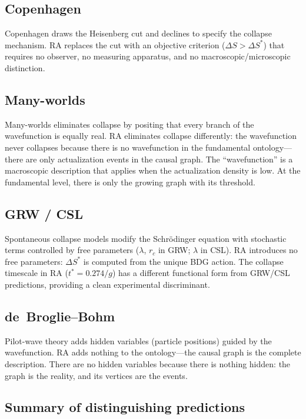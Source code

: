 \documentclass[11pt,a4paper]{article}
\theoremstyle{plain}
\theoremstyle{definition}
\theoremstyle{remark}
\begin{document}
\subsection{Copenhagen}\label{sec:copenhagen}

Copenhagen draws the Heisenberg cut and declines to specify the collapse mechanism.
RA replaces the cut with an objective criterion ($\Delta S > \Delta S^*$) that
requires no observer, no measuring apparatus, and no macroscopic/microscopic
distinction.

\subsection{Many-worlds}\label{sec:manyworlds}

Many-worlds eliminates collapse by positing that every branch of the wavefunction is
equally real.  RA eliminates collapse differently: the wavefunction never collapses
because there is no wavefunction in the fundamental ontology---there are only
actualization events in the causal graph.  The ``wavefunction'' is a macroscopic
description that applies when the actualization density is low.  At the fundamental
level, there is only the growing graph with its threshold.

\subsection{GRW / CSL}\label{sec:grw}

Spontaneous collapse models modify the Schr\"odinger equation with stochastic terms
controlled by free parameters ($\lambda$, $r_c$ in GRW; $\lambda$ in CSL).  RA
introduces no free parameters: $\Delta S^*$ is computed from the unique BDG action.
The collapse timescale in RA ($t^* = 0.274/g$) has a different functional form from
GRW/CSL predictions, providing a clean experimental discriminant.

\subsection{de~Broglie--Bohm}\label{sec:bohm}

Pilot-wave theory adds hidden variables (particle positions) guided by the
wavefunction.  RA adds nothing to the ontology---the causal graph is the complete
description.  There are no hidden variables because there is nothing hidden: the
graph is the reality, and its vertices are the events.

\subsection{Summary of distinguishing predictions}\label{sec:summary-pred}
\end{document}

